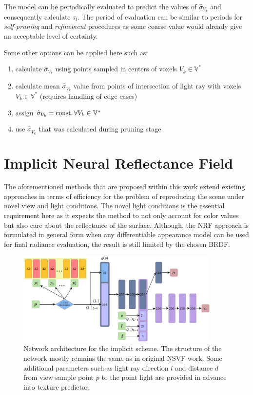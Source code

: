 The model can be periodically evaluated to predict the values of $\hat{\sigma}_{V_k}$ and consequently calculate $\tau_l$.
The period of evaluation can be similar to periods for \textit{self-pruning} and \textit{refinement} procedures
as some coarse value would already give an acceptable level of certainty.

Some other options can be applied here such as:
\begin{enumerate}
    \item calculate $\hat{\sigma}_{V_k}$ using points sampled in centers of voxels $V_k \in \mathbb{V}^*$
    \item calculate mean $\hat{\sigma}_{V_k}$ value from points of intersection of light ray with voxels $V_k \in \mathbb{V}^*$ (requires handling of edge cases)
    \item assign $\hat{\sigma}_{V_k} = \mathrm{const}, \forall V_k \in \mathbb{V}^*$
    \item use $\hat{\sigma}_{V_k}$ that was calculated during pruning stage
\end{enumerate}



\section{Implicit Neural Reflectance Field}
\label{sec:implicit_scheme}

The aforementioned methods that are proposed within this work
extend existing approaches in terms of efficiency for the problem of reproducing the scene under novel view and light conditions.
The novel light conditions is the essential requirement here
as it expects the method to not only account for color values
but also care about the reflectance of the surface.
Although, the NRF approach is formulated in general form
when any differentiable appearance model can be used for final radiance evaluation,
the result is still limited by the chosen BRDF.

\begin{figure}[!htb]
    \centering
    \includegraphics[width=0.9\textwidth]{figures/implicit_scheme.png}
    \caption{Network architecture for the implicit scheme.
The structure of the network mostly remains the same as in original NSVF work.
Some additional parameters such as light ray direction $l$
and distance $d$ from view sample point $p$ to the point light
are provided in advance into texture predictor.
}
    \label{fig:implicit_scheme}
\end{figure}

